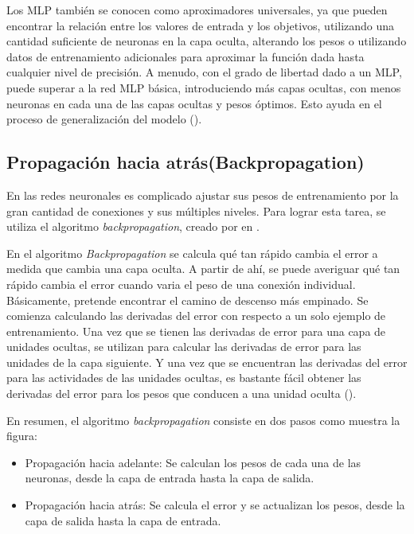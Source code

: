 Los MLP también se conocen como aproximadores universales, ya que pueden encontrar la relación entre los valores de entrada y los objetivos, utilizando una cantidad suficiente de neuronas en la capa oculta, alterando los pesos o utilizando datos de entrenamiento adicionales para aproximar la función dada hasta cualquier nivel de precisión. A menudo, con el grado de libertad dado a un MLP, puede superar a la red MLP básica, introduciendo más capas ocultas, con menos neuronas en cada una de las capas ocultas y pesos óptimos. Esto ayuda en el proceso de generalización del modelo (\cite{goyal2018Deep}).

\subsection{Propagación hacia atrás(Backpropagation)}

En las redes neuronales es complicado ajustar sus pesos de entrenamiento por la gran cantidad de conexiones y sus múltiples niveles. Para lograr esta tarea, se utiliza el algoritmo \textit{backpropagation}, creado por \citeauthor{rumelhart1986Parallel} en \citeyear{rumelhart1986Parallel}.

En el algoritmo \textit{Backpropagation} se calcula qué tan rápido cambia el error a medida que cambia una capa oculta. A partir de ahí, se puede averiguar qué tan rápido cambia el error cuando varia el peso de una conexión individual. Básicamente, pretende encontrar el camino de descenso más empinado. Se comienza calculando las derivadas del error con respecto a un solo ejemplo de entrenamiento. Una vez que se tienen las derivadas de error para una capa de unidades ocultas, se utilizan para calcular las derivadas de error para las unidades de la capa siguiente. Y una vez que se encuentran las derivadas del error para las actividades de las unidades ocultas, es bastante fácil obtener las derivadas del error para los pesos que conducen a una unidad oculta (\cite{buduma2017Fundamentals}).

En resumen, el algoritmo \textit{backpropagation} consiste en dos pasos como muestra la figura:

\begin{itemize}
\item Propagación hacia adelante: Se calculan los pesos de cada una de las neuronas, desde la capa de entrada hasta la capa de salida.

\item Propagación hacia atrás: Se calcula el error y se actualizan los pesos, desde la capa de salida hasta la capa de entrada.
\end{itemize}

